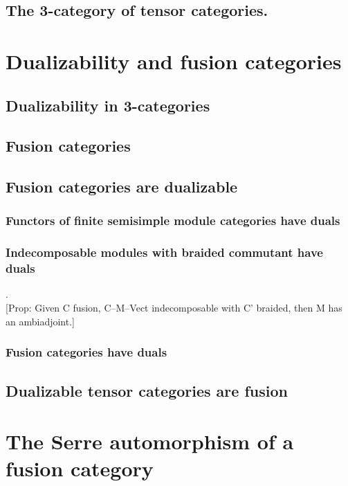 \documentclass{amsart}
\begin{document}
\subsection{The 3-category of tensor categories.}

\section{Dualizability and fusion categories}

\subsection{Dualizability in 3-categories}

\subsection{Fusion categories}

\subsection{Fusion categories are dualizable}

\subsubsection{Functors of finite semisimple module categories have duals}

\subsubsection{Indecomposable modules with braided commutant have duals} .\\

	[Prop: Given C fusion, C--M--Vect indecomposable with C' braided, then M has an ambiadjoint.]

\subsubsection{Fusion categories have duals}

\subsection{Dualizable tensor categories are fusion}

\section{The Serre automorphism of a fusion category}
\end{document}
